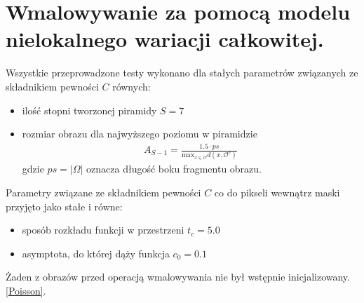 \documentclass[12pt, twoside, openany]{report}
\theoremstyle{definition}
\begin{document}
\section{Wmalowywanie za pomocą modelu nielokalnego wariacji całkowitej.}
Wszystkie przeprowadzone testy wykonano dla stałych parametrów związanych ze składnikiem pewności $C$ równych:
\begin{itemize}
\item
ilość stopni tworzonej piramidy $S=7$
\item
rozmiar obrazu dla najwyższego poziomu w piramidzie 
\begin{align}
A_{S-1}=\frac{1.5 \cdot ps}{\mathrm{max}_{x \in \mathcal{O}}d(x,\mathcal{O}^{c})}
\end{align}
gdzie $ps = |\Omega|$ oznacza długość boku fragmentu obrazu.
\end{itemize}
Parametry związane ze składnikiem pewności $C$ co do pikseli wewnątrz maski przyjęto jako stałe i równe:
\begin{itemize}
\item
sposób rozkładu funkcji w przestrzeni $t_{c}=5.0$
\item 
asymptota, do której dąży funkcja $c_{0}=0.1$
\end{itemize}
Żaden z obrazów przed operacją wmalowywania nie był wstępnie inicjalizowany. \eqref{Poisson}.
\end{document}
